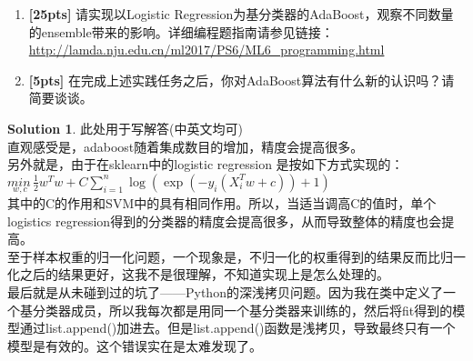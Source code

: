 \documentclass[a4paper,UTF8]{article}
\numberwithin{equation}{section}
\theoremstyle{definition}
\newtheorem*{solution}{Solution}
\begin{document}
\begin{enumerate}[ {(}1{)}]
\item \textbf{[25pts]} 请实现以Logistic Regression为基分类器的AdaBoost，观察不同数量的ensemble带来的影响。详细编程题指南请参见链接：
\url{http://lamda.nju.edu.cn/ml2017/PS6/ML6_programming.html}
\item \textbf{[5pts]} 在完成上述实践任务之后，你对AdaBoost算法有什么新的认识吗？请简要谈谈。
\end{enumerate}
\begin{solution}
此处用于写解答(中英文均可)\\
直观感受是，adaboost随着集成数目的增加，精度会提高很多。\\
另外就是，由于在sklearn中的logistic regression 是按如下方式实现的：\\
$\underset{w, c}{min\,} \frac{1}{2}w^T w + C \sum_{i=1}^n \log(\exp(- y_i (X_i^T w + c)) + 1)$\\
其中的C的作用和SVM中的具有相同作用。所以，当适当调高C的值时，单个logistics regression得到的分类器的精度会提高很多，从而导致整体的精度也会提高。\\
至于样本权重的归一化问题，一个现象是，不归一化的权重得到的结果反而比归一化之后的结果更好，这我不是很理解，不知道实现上是怎么处理的。\\
最后就是从未碰到过的坑了——Python的深浅拷贝问题。因为我在类中定义了一个基分类器成员，所以我每次都是用同一个基分类器来训练的，然后将fit得到的模型通过list.append()加进去。但是list.append()函数是浅拷贝，导致最终只有一个模型是有效的。这个错误实在是太难发现了。\\
\end{solution}
\end{document}

